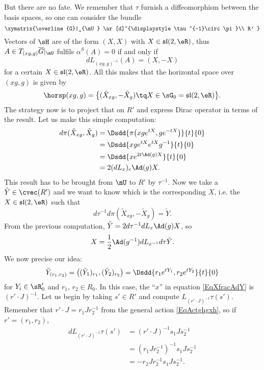 But there are no fate. We remember that $\tau$ furnish a diffeomorphism between the basis spaces, so one can consider the bundle
\[
  \xymatrix{%
   \overline{G}|_{\mU} \ar[d]^{\displaystyle\tau^{-1}\circ\pi}\\
   R'
}
\]
Vectors of $\sH$ are of the form $(X,X)$ with $X\in\mathfrak{sl}(2,\eR)$, thus $A\in T_{(xg,g)}\overline{G}|_{\mU}$ fulfils $\alpha^{S}(A)=0$ if and only if
\[
  dL_{(xg,g)^{-1}}(A)=(X,-X)
\]
for a certain $X\in \mathfrak{sl}(2,\eR)$. All this makes that the horizontal space over $(xg,g)$ is given by
\begin{equation}
\horsp(xg,g)=\big\{ (\tilde X_{xg},-\tilde X_{g})\tq X\in \sG_0=\mathfrak{sl}(2,\eR) \big\}.
\end{equation}
The strategy now is to project that on $R'$ and express Dirac operator in terms of the result. Let us make this simple computation:
\begin{align*}
d\pi(\tilde X_{xg},\tilde X_{g})&=\Dsdd{ \pi\big( xg e^{tX},g e^{-tX} \big) }{t}{0}\\
        &=\Dsdd{ xg e^{tX} e^{tX}g^{-1} }{t}{0}\\
        &=\Dsdd{ x e^{2t\Ad(g)X} }{t}{0}\\
        &=2(dL_{x})_{e}\Ad(g)X.
\end{align*}
This result has to be brought from $\mU$ to $R'$ by $\tau^{-1}$. Now we take a $\tilde Y\in\cvec(R')$ and we want to know which is the corresponding $X$, i.e. the $X\in\mathfrak{sl}(2,\eR)$ such that
\[
  d\tau^{-1}d\pi(\tilde X_{xg},-\tilde X_{g})=\tilde Y.
\]
From the previous computation, $\tilde Y=2d\tau^{-1}dL_{x}\Ad(g)X$, so
\begin{equation}  \label{EqXfracAdY}
  X=\frac{ 1 }{2}\Ad(g^{-1})dL_{x^{-1}}d\tau\tilde Y.
\end{equation}
We now precise our idea:
\begin{equation}   \label{EqtildeYrunrdeux}
  \tilde Y_{(r_{1},r_2)}=\big(    (\tilde Y_{1})_{r_1},(\tilde Y_{2})_{r_2}   \big)=\Dsdd{ r_1 e^{tY_{1}},r_2 e^{tY_{2}} }{t}{0}
\end{equation}
for $Y_{i}\in\sR'_{0}$ and $r_1$, $r_2\in R_{0}$. In this case, the ``$x$'' in equation \eqref{EqXfracAdY} is $(r'\cdot J)^{-1}$. Let us begin by taking $s'\in R'$ and compute $L_{(r'\cdot J)^{-1}}\tau(s')$. Remember that $r'\cdot J=r_1Jr_2^{-1}$ from the general action \eqref{EqActghgxh}, so if $r'=(r_1,r_2)$,
\begin{align*}
  dL_{(r'\cdot J)^{-1}}\tau(s')&=(r'\cdot J)^{-1}s_1 Js_2^{-1}\\
        &=(r_1Jr_2^{-1})^{-1}s_1Js_2^{-1}\\
        &=-r_2Jr_2^{-1}s_1Js_2^{-1}.
\end{align*}
